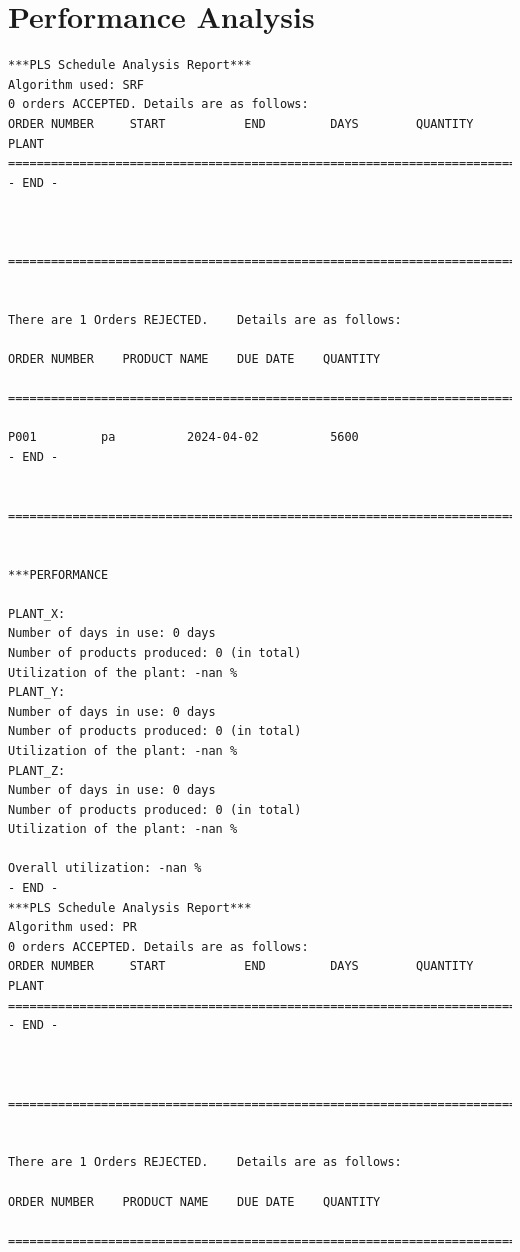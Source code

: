 \documentclass[a4paper, 12pt]{article}
\begin{document}
\section{Performance Analysis}

\begin{lstlisting}
***PLS Schedule Analysis Report***
Algorithm used: SRF
0 orders ACCEPTED. Details are as follows:
ORDER NUMBER     START           END         DAYS        QUANTITY        PLANT
===========================================================================================
- END -



==========================================================================================================


There are 1 Orders REJECTED.    Details are as follows:

ORDER NUMBER    PRODUCT NAME    DUE DATE    QUANTITY

==========================================================================================================

P001         pa          2024-04-02          5600
- END -


===========================================================================================================


***PERFORMANCE

PLANT_X:
Number of days in use: 0 days
Number of products produced: 0 (in total)
Utilization of the plant: -nan %
PLANT_Y:
Number of days in use: 0 days
Number of products produced: 0 (in total)
Utilization of the plant: -nan %
PLANT_Z:
Number of days in use: 0 days
Number of products produced: 0 (in total)
Utilization of the plant: -nan %

Overall utilization: -nan %
- END -
***PLS Schedule Analysis Report***
Algorithm used: PR
0 orders ACCEPTED. Details are as follows:
ORDER NUMBER     START           END         DAYS        QUANTITY        PLANT
===========================================================================================
- END -



==========================================================================================================


There are 1 Orders REJECTED.    Details are as follows:

ORDER NUMBER    PRODUCT NAME    DUE DATE    QUANTITY

==========================================================================================================


\end{lstlisting}
\end{document}
